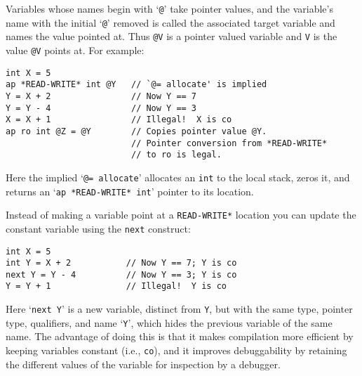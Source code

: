 \documentclass[12pt]{article}
\newenvironment{indpar}[1][0.3in]%
	{\begin{list}{}%
		     {\setlength{\itemsep}{0in}%
		      \setlength{\topsep}{0in}%
		      \setlength{\parsep}{1ex}%
		      \setlength{\labelwidth}{#1}%
		      \setlength{\leftmargin}{#1}%
		      \addtolength{\leftmargin}{\labelsep}}%
	 \item}%
	{\end{list}}
\begin{document}
Variables whose names begin with `{\tt @}' take pointer values, and
the variable's name with the
initial `{\tt @}' removed is called the associated
target variable and names the value pointed at.
Thus {\tt @V} is a pointer valued variable and {\tt V} is the value
{\tt @V} points at.
For example:

\begin{indpar}\begin{verbatim}
int X = 5
ap *READ-WRITE* int @Y   // `@= allocate' is implied
Y = X + 2                // Now Y == 7
Y = Y - 4                // Now Y == 3
X = X + 1                // Illegal!  X is co
ap ro int @Z = @Y        // Copies pointer value @Y.
                         // Pointer conversion from *READ-WRITE*
                         // to ro is legal.
\end{verbatim}\end{indpar}

Here the implied `{\tt @= allocate}' allocates an {\tt int} to the local
stack, zeros it, and returns an `{\tt ap *READ-WRITE* int}'
pointer to its location.

Instead of making a variable point at a {\tt *READ-WRITE*} location you
can update the constant variable using the {\tt next} construct:
\begin{indpar}\begin{verbatim}
int X = 5
int Y = X + 2           // Now Y == 7; Y is co
next Y = Y - 4          // Now Y == 3; Y is co
Y = Y + 1               // Illegal!  Y is co
\end{verbatim}\end{indpar}
Here `{\tt next Y}' is a new variable, distinct from {\tt Y},
but with the same type, pointer type, qualifiers, and name `{\tt Y}',
which hides the previous variable of the same name.
The advantage of doing this is that it makes compilation more
efficient by keeping variables constant (i.e., {\tt co}), and
it improves debuggability by retaining the different values of
the variable for inspection by a debugger.
\end{document}

